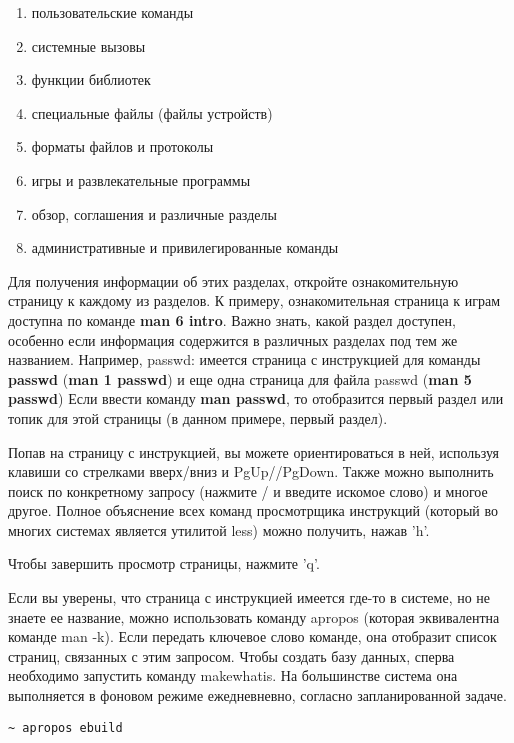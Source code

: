 \documentclass[12pt]{book}
\begin{document}
\begin{enumerate}
	\item пользовательские команды
	\item системные вызовы
	\item функции библиотек
	\item специальные файлы (файлы устройств)
	\item форматы файлов и протоколы
	\item игры и развлекательные программы
	\item обзор, соглашения и различные разделы
	\item административные и привилегированные команды
\end{enumerate}

Для получения информации об этих разделах, откройте ознакомительную страницу к каждому из разделов. К примеру, ознакомительная страница к играм доступна по команде \textbf{man 6 intro}. Важно знать, какой раздел доступен, особенно если информация содержится в различных разделах под тем же названием. Например, passwd: имеется страница с инструкцией для команды \textbf{passwd} (\textbf{man 1 passwd}) и еще одна страница для файла passwd (\textbf{man 5 passwd}) Если ввести команду \textbf{man passwd}, то отобразится первый раздел или топик для этой страницы (в данном примере, первый раздел).

Попав на страницу с инструкцией, вы можете ориентироваться в ней, используя клавиши со стрелками вверх/вниз  и PgUp//PgDown. Также можно выполнить поиск по конкретному запросу (нажмите / и введите искомое слово) и многое другое. Полное объяснение всех команд просмотрщика инструкций (который во многих системах является утилитой less) можно получить, нажав 'h'.

Чтобы завершить просмотр страницы, нажмите 'q'.

Если вы уверены, что страница с инструкцией имеется где-то в системе, но не знаете ее название, можно использовать команду apropos (которая эквивалентна команде man -k). Если передать ключевое слово команде, она отобразит список страниц, связанных с этим запросом. Чтобы создать базу данных, сперва необходимо запустить команду makewhatis. На большинстве система она выполняется в фоновом режиме ежедневневно, согласно запланированной задаче.  

\vspace{3mm}
\begin{tcolorbox}
\begin{lstlisting}
~ apropos ebuild 
\end{lstlisting}
\end{tcolorbox}
\end{document}

